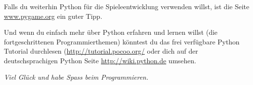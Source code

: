 

\vspace{1em}
Falls du weiterhin Python für die Spieleentwicklung verwenden willst, ist die Seite \href{http://www.pygame.org}{www.pygame.org} ein guter Tipp.

\vspace{1em}
Und wenn du einfach mehr über Python erfahren und lernen willst (die fortgeschrittenen Programmierthemen) könntest du das frei verfügbare Python Tutorial durchlesen (\href{http://tutorial.pocoo.org/}{http://tutorial.pocoo.org/} oder dich auf der deutschsprachigen Python Seite \href{http://wiki.python.de}{http://wiki.python.de} umsehen.

\vspace{1em}
\emph{Viel Glück und habe Spass beim Programmieren.}

\newpage
